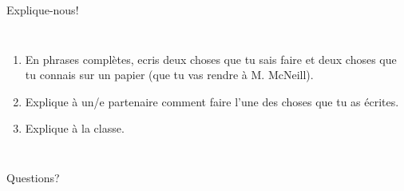 \documentclass{beamer}
\begin{document}
  \begin{frame}{Explique-nous!}
    \begin{columns}
        \begin{enumerate}
          \item \alert{En phrases complètes}, ecris deux choses que tu sais faire et deux choses que tu connais sur un papier (que tu vas rendre à M. McNeill).
          \item<2-> Explique à un/e partenaire comment faire l'une des choses que tu as écrites.
          \item<3-> Explique à la classe.
        \end{enumerate}
    \end{columns}
  \end{frame}

  \begin{frame}{}
    \begin{center}
      \Large Questions?
    \end{center}
  \end{frame}
\end{document}
